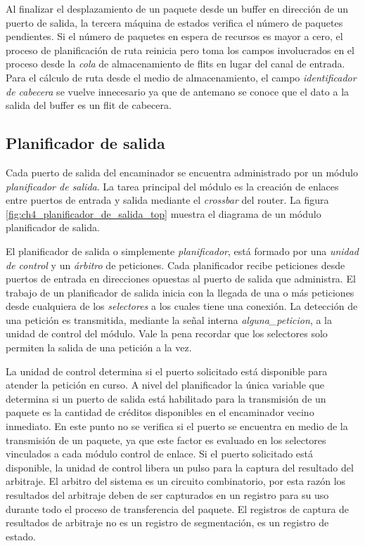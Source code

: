 Al finalizar el desplazamiento de un paquete desde un buffer en dirección de un puerto de salida, la tercera máquina de estados verifica el número de paquetes pendientes. Si el número de paquetes en espera de recursos es mayor a cero, el proceso de planificación de ruta reinicia pero toma los campos involucrados en el proceso desde la \textit{cola} de almacenamiento de flits en lugar del canal de entrada. Para el cálculo de ruta desde el medio de almacenamiento, el campo \textit{identificador de cabecera} se vuelve innecesario ya que de antemano se conoce que el dato a la salida del buffer es un flit de cabecera.




\subsection{Planificador de salida}\label{subsec:planificador_de_salida}

Cada puerto de salida del encaminador se encuentra administrado por un módulo \textit{planificador de salida}. La tarea principal del módulo es la creación de enlaces entre puertos de entrada y salida mediante el \textit{crossbar} del router. La figura \ref{fig:ch4_planificador_de_salida_top} muestra el diagrama de un módulo planificador de salida.

El planificador de salida o simplemente \textit{planificador}, está formado por una \textit{unidad de control} y un \textit{árbitro} de peticiones. Cada planificador recibe peticiones desde puertos de entrada en direcciones opuestas al puerto de salida que administra. El trabajo de un planificador de salida inicia con la llegada de una o más peticiones desde cualquiera de los \textit{selectores} a los cuales tiene una conexión. La detección de una petición es transmitida, mediante la señal interna \textit{alguna\_peticion}, a la unidad de control del módulo. Vale la pena recordar que los selectores solo permiten la salida de una petición a la vez.

La unidad de control determina si el puerto solicitado está disponible para atender la petición en curso. A nivel del planificador la única variable que determina si un puerto de salida está habilitado para la transmisión de un paquete es la cantidad de créditos disponibles en el encaminador vecino inmediato. En este punto no se verifica si el puerto se encuentra en medio de la transmisión de un paquete, ya que este factor es evaluado en los selectores vinculados a cada módulo control de enlace. Si el puerto solicitado está disponible, la unidad de control libera un pulso para la captura del resultado del arbitraje. El arbitro del sistema es un circuito combinatorio, por esta razón los resultados del arbitraje deben de ser capturados en un registro para su uso durante todo el proceso de transferencia del paquete. El registros de captura de resultados de arbitraje no es un registro de segmentación, es un registro de estado.


